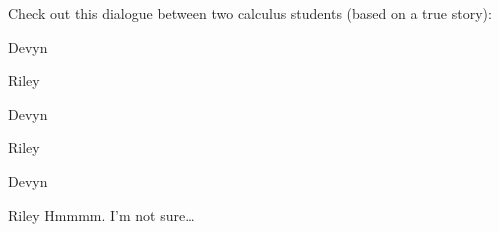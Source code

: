 \documentclass{ximera}
\title[Break-Ground:]{ }
\begin{document}
\begin{abstract}
\end{abstract}
\maketitle

Check out this dialogue between two calculus students (based on a true
story):

\begin{dialogue}
\item[Devyn] 
\item[Riley] 
\item[Devyn] 
\item[Riley] 
\item[Devyn] 
\item[Riley] Hmmmm. I'm not sure\dots
\end{dialogue}





\end{document}
